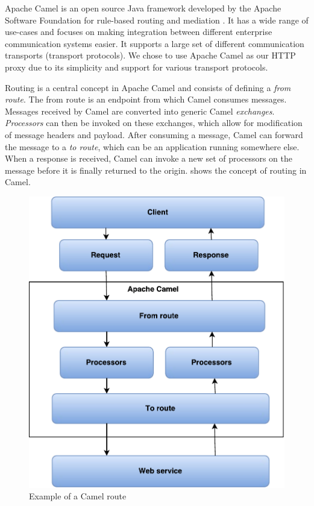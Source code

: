 Apache Camel is an open source Java framework developed by the Apache Software
Foundation for rule-based routing and mediation \cite{camel-homepage}. It has a
wide range of use-cases and focuses on making integration between different
enterprise communication systems easier. It supports a large set of different
communication transports (transport protocols). We chose to use Apache Camel as
our HTTP proxy due to its simplicity and support for various transport
protocols.

Routing is a central concept in Apache Camel and consists of defining a
\textit{from route}. The from route is an endpoint from which Camel consumes
messages. Messages received by Camel are converted into generic Camel
\textit{exchanges}. \textit{Processors} can then be invoked on these exchanges,
which allow for modification of message headers and payload. After consuming a
message, Camel can forward the message to a \textit{to route}, which can be an
application running somewhere else. When a response is received, Camel can
invoke a new set of processors on the message before it is finally returned to
the origin.  shows the concept of routing in Camel.

\begin{figure}[h]
\centering
\includegraphics[scale=0.6]{images/camel_routes.pdf}
\caption{Example of a Camel route}
\label{figure:camel-route}
\end{figure}

